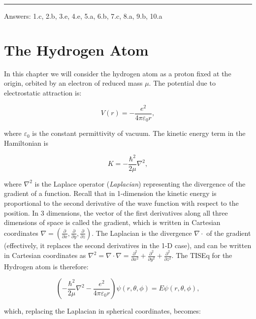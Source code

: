 \documentclass[
  english,
  9pt,
]{extbook}
\theoremstyle{definition}
\theoremstyle{definition}
\theoremstyle{definition}
\theoremstyle{definition}
\theoremstyle{remark}
\begin{document}
\begin{center}\rule{0.5\linewidth}{0.5pt}\end{center}

Answers: 1.c, 2.b, 3.e, 4.e, 5.a, 6.b, 7.c, 8.a, 9.b, 10.a

\chapter{The Hydrogen Atom}\label{Hydrogen}

In this chapter we will consider the hydrogen atom as a proton fixed at the origin, orbited by an electron of reduced mass \(\mu\). The potential due to electrostatic attraction is:

\begin{equation}
V(r) = - \frac{e^2}{4 \pi \varepsilon_0 r},
\label{eq:HA1}
\end{equation}

where \(\varepsilon_0\) is the constant permittivity of vacuum.
The kinetic energy term in the Hamiltonian is

\begin{equation}
K = - \frac{\hbar^2}{2 \mu} \nabla^2,
\label{eq:HA2}
\end{equation}

where \(\nabla^2\) is the Laplace operator (\emph{Laplacian}) representing the divergence of the gradient of a function. Recall that in 1-dimension the kinetic energy is proportional to the second derivative of the wave function with respect to the position. In 3 dimensions, the vector of the first derivatives along all three dimensions of space is called the gradient, which is written in Cartesian coordinates \(\nabla = \left(\frac{\partial}{\partial x},\frac{\partial}{\partial y},\frac{\partial}{\partial z} \right)\). The Laplacian is the divergence \(\nabla \cdot\) of the gradient (effectively, it replaces the second derivatives in the 1-D case), and can be written in Cartesian coordinates as \(\nabla^2=\nabla\cdot\nabla=\frac{\partial^2}{\partial x^2}+\frac{\partial^2}{\partial y^2}+\frac{\partial^2}{\partial z^2}\). The TISEq for the Hydrogen atom is therefore:

\begin{equation}
{\displaystyle \left(-{\frac {\hbar ^{2}}{2\mu }}\nabla ^{2}-{\frac {e^{2}}{4\pi \varepsilon _{0}r}}\right)\psi (r,\theta ,\phi )=E\psi (r,\theta ,\phi )},
\label{eq:HA2b}
\end{equation}

which, replacing the Laplacian in spherical coordinates, becomes:
\end{document}
